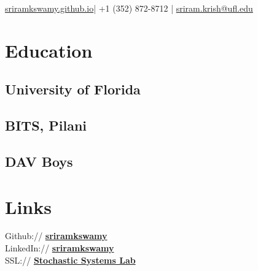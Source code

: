\documentclass[]{resume}
\begin{document}
%
%

%
%
{\href{http://sriramkswamy.github.io}{sriramkswamy.github.io}|
	+1 (352) 872-8712	| \href{mailto:sriram.krish@ufl.edu}{sriram.krish@ufl.edu}
}

%
%

\begin{minipage}[t]{0.33\textwidth}


\section{Education}

\subsection{University of Florida}
\sectionsep

\subsection{BITS, Pilani}
\sectionsep

\subsection{DAV Boys}
\sectionsep


\section{Links}
Github:// \href{https://github.com/sriramkswamy}{\bf sriramkswamy} \\
LinkedIn://  \href{https://www.linkedin.com/in/sriramkswamy}{\bf sriramkswamy} \\
SSL://  \href{http://web.mae.ufl.edu/~mrinalkumar/Research/research.html}{\bf Stochastic Systems Lab} \\


\end{minipage}
\end{document}

